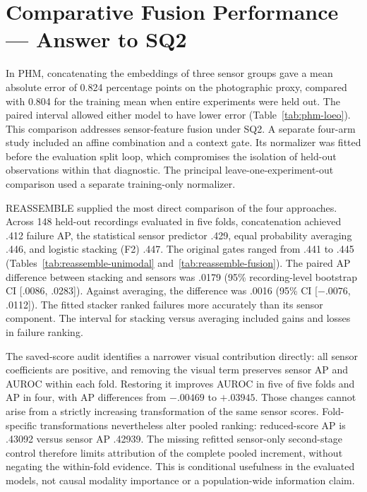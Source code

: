 \section{Comparative Fusion Performance --- Answer to SQ2}
In PHM, concatenating the embeddings of three sensor groups gave a mean absolute error of 0.824 percentage points on the photographic proxy, compared with 0.804 for the training mean when entire experiments were held out. The paired interval allowed either model to have lower error (Table~\ref{tab:phm-loeo}). This comparison addresses sensor-feature fusion under SQ2. A separate four-arm study included an affine combination and a context gate. Its normalizer was fitted before the evaluation split loop, which compromises the isolation of held-out observations within that diagnostic. The principal leave-one-experiment-out comparison used a separate training-only normalizer.

REASSEMBLE supplied the most direct comparison of the four approaches. Across 148 held-out recordings evaluated in five folds, concatenation achieved .412 failure AP, the statistical sensor predictor .429, equal probability averaging .446, and logistic stacking (F2) .447. The original gates ranged from .441 to .445 (Tables~\ref{tab:reassemble-unimodal} and~\ref{tab:reassemble-fusion}). The paired AP difference between stacking and sensors was .0179 (95\% recording-level bootstrap CI [.0086, .0283]). Against averaging, the difference was .0016 (95\% CI [$-.0076$, .0112]). The fitted stacker ranked failures more accurately than its sensor component. The interval for stacking versus averaging included gains and losses in failure ranking.

The saved-score audit identifies a narrower visual contribution directly: all sensor coefficients are positive, and removing the visual term preserves sensor AP and AUROC within each fold. Restoring it improves AUROC in five of five folds and AP in four, with AP differences from $-.00469$ to $+.03945$. Those changes cannot arise from a strictly increasing transformation of the same sensor scores. Fold-specific transformations nevertheless alter pooled ranking: reduced-score AP is .43092 versus sensor AP .42939. The missing refitted sensor-only second-stage control therefore limits attribution of the complete pooled increment, without negating the within-fold evidence. This is conditional usefulness in the evaluated models, not causal modality importance or a population-wide information claim.

